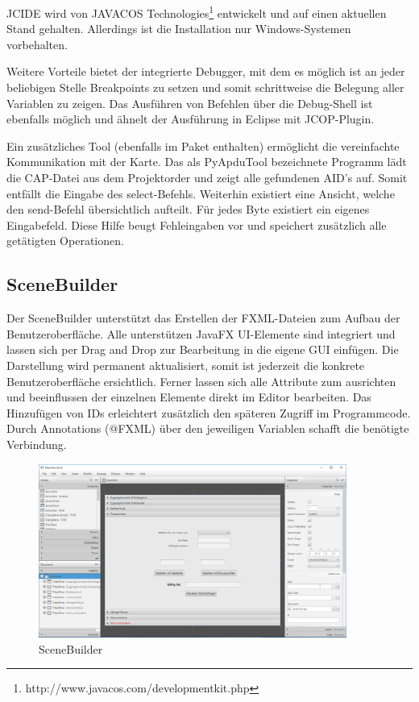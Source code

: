 \documentclass[	a4paper,
			11pt,
			oneside,
			parskip]{scrartcl}
\begin{document}
JCIDE wird von JAVACOS Technologies\footnote{http://www.javacos.com/developmentkit.php} entwickelt und auf einen aktuellen Stand gehalten. Allerdings ist die Installation nur  Windows-Systemen vorbehalten. \medskip

Weitere Vorteile bietet der integrierte Debugger, mit dem es möglich ist an jeder beliebigen Stelle Breakpoints zu setzen und somit schrittweise die Belegung aller Variablen zu zeigen.
Das Ausführen von Befehlen über die Debug-Shell ist ebenfalls möglich und ähnelt der Ausführung in Eclipse mit JCOP-Plugin. \medskip

Ein zusätzliches Tool (ebenfalls im Paket enthalten) ermöglicht die vereinfachte Kommunikation mit der Karte. Das als \glqq PyApduTool\grqq\/ bezeichnete Programm lädt die CAP-Datei aus dem Projektorder und zeigt alle gefundenen AID's auf. Somit entfällt die Eingabe des select-Befehls. Weiterhin existiert eine Ansicht, welche den send-Befehl übersichtlich aufteilt. Für jedes Byte existiert ein eigenes Eingabefeld. Diese Hilfe beugt Fehleingaben vor und speichert zusätzlich alle getätigten Operationen.

\subsection{SceneBuilder}

Der SceneBuilder unterstützt das Erstellen der FXML-Dateien zum Aufbau der Benutzeroberfläche. Alle unterstützen JavaFX UI-Elemente sind integriert und lassen sich per \glqq Drag and Drop\grqq\/ zur Bearbeitung in die eigene GUI einfügen. Die Darstellung wird permanent aktualisiert, somit ist jederzeit die konkrete Benutzeroberfläche ersichtlich. Ferner lassen sich alle Attribute zum ausrichten und beeinflussen der einzelnen Elemente direkt im Editor bearbeiten. Das Hinzufügen von IDs erleichtert zusätzlich den späteren Zugriff im Programmcode. Durch Annotations (@FXML) über den jeweiligen Variablen schafft die benötigte Verbindung.

\begin{figure}[H]
	\centering
  	\includegraphics[width=0.9\textwidth]{img/scenebuilder}
	\caption{SceneBuilder}
	\label{scene}
\end{figure}
\end{document}
